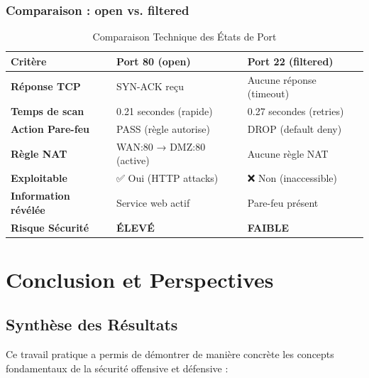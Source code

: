 \documentclass[12pt,a4paper,openany]{report}
\newcommand{\tableheadcolor}{\rowcolor{tableheadbg}}
\begin{document}
	\subsection{Comparaison : open vs. filtered}
	
	\begin{table}[H]
		\centering
		\renewcommand{\arraystretch}{1.6}
		\setlength{\arrayrulewidth}{0.5pt}
		\begin{tabular}{>{\bfseries}p{3.5cm} p{5.5cm} p{5.5cm}}
			\arrayrulecolor{tableborder}
			\hline
			\tableheadcolor
			\textcolor{tableheadfg}{\textbf{Critère}} &
			\textcolor{tableheadfg}{\textbf{Port 80 (open)}} &
			\textcolor{tableheadfg}{\textbf{Port 22 (filtered)}} \\
			\hline
			\rowcolor{tablerowalt}
			Réponse TCP & SYN-ACK reçu & Aucune réponse (timeout) \\
			
			Temps de scan & 0.21 secondes (rapide) & 0.27 secondes (retries) \\
			
			\rowcolor{tablerowalt}
			Action Pare-feu & PASS (règle autorise) & DROP (default deny) \\
			
			Règle NAT & WAN:80 → DMZ:80 (active) & Aucune règle NAT \\
			
			\rowcolor{tablerowalt}
			Exploitable & ✅ Oui (HTTP attacks) & ❌ Non (inaccessible) \\
			
			Information révélée & Service web actif & Pare-feu présent \\
			
			\rowcolor{tablerowalt}
			Risque Sécurité & \textcolor{accent}{\textbf{ÉLEVÉ}} & \textcolor{green!50!black}{\textbf{FAIBLE}} \\
			\hline
		\end{tabular}
		\caption{Comparaison Technique des États de Port}
	\end{table}
	
	\chapter{Conclusion et Perspectives}
	
	\section{Synthèse des Résultats}
	Ce travail pratique a permis de démontrer de manière concrète les concepts fondamentaux de la sécurité offensive et défensive :
	
\end{document}
